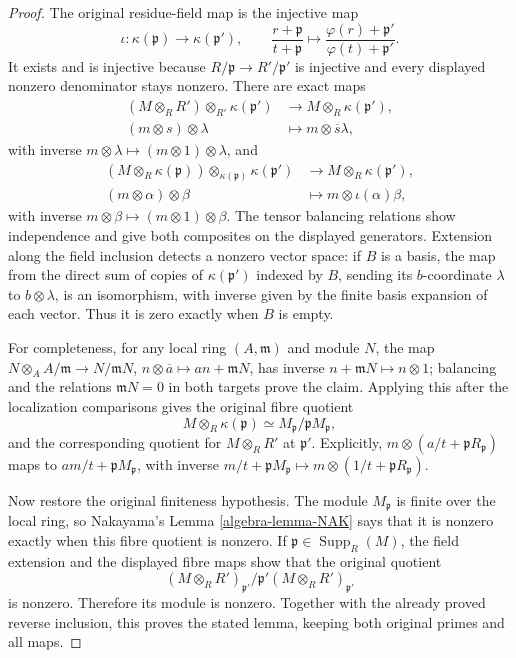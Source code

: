 \begin{proof}
The original residue-field map is the injective map
$$
\iota:\kappa(\mathfrak p)\longrightarrow\kappa(\mathfrak p'),
\qquad
\frac{r+\mathfrak p}{t+\mathfrak p}
\longmapsto
\frac{\varphi(r)+\mathfrak p'}{\varphi(t)+\mathfrak p'}.
$$
It exists and is injective because $R/\mathfrak p\to
R'/\mathfrak p'$ is injective and every displayed
nonzero denominator stays nonzero. There are exact maps
$$
\begin{split}
(M\otimes_RR')\otimes_{R'}\kappa(\mathfrak p')
&\longrightarrow M\otimes_R\kappa(\mathfrak p'),\\
(m\otimes s)\otimes\lambda
&\longmapsto m\otimes\overline s\lambda,
\end{split}
$$
with inverse $m\otimes\lambda\mapsto(m\otimes1)\otimes\lambda$,
and
$$
\begin{split}
(M\otimes_R\kappa(\mathfrak p))
\otimes_{\kappa(\mathfrak p)}\kappa(\mathfrak p')
&\longrightarrow M\otimes_R\kappa(\mathfrak p'),\\
(m\otimes\alpha)\otimes\beta
&\longmapsto m\otimes\iota(\alpha)\beta,
\end{split}
$$
with inverse $m\otimes\beta\mapsto(m\otimes1)\otimes\beta$.
The tensor balancing relations show independence and give
both composites on the displayed generators. Extension
along the field inclusion detects a nonzero vector space:
if $B$ is a basis, the map from the direct sum of copies
of $\kappa(\mathfrak p')$ indexed by $B$, sending its
$b$-coordinate $\lambda$ to $b\otimes\lambda$, is an
isomorphism, with inverse given by the finite basis
expansion of each vector. Thus it is zero exactly when
$B$ is empty.

For completeness, for any local ring $(A,\mathfrak m)$
and module $N$, the map
$N\otimes_A A/\mathfrak m\to N/\mathfrak mN$,
$n\otimes\overline a\mapsto an+\mathfrak mN$, has inverse
$n+\mathfrak mN\mapsto n\otimes1$; balancing and the
relations $\mathfrak mN=0$ in both targets prove the claim.
Applying this after the localization comparisons gives the
original fibre quotient
$$
M\otimes_R\kappa(\mathfrak p)
\simeq M_{\mathfrak p}/\mathfrak pM_{\mathfrak p},
$$
and the corresponding quotient for $M\otimes_RR'$ at
$\mathfrak p'$. Explicitly,
$m\otimes(a/t+\mathfrak pR_{\mathfrak p})$ maps to
$am/t+\mathfrak pM_{\mathfrak p}$, with inverse
$m/t+\mathfrak pM_{\mathfrak p}\mapsto
m\otimes(1/t+\mathfrak pR_{\mathfrak p})$.

Now restore the original finiteness hypothesis. The module
$M_{\mathfrak p}$ is finite over the local ring, so
Nakayama's Lemma \ref{algebra-lemma-NAK} says that it is nonzero
exactly when this fibre quotient is nonzero. If
$\mathfrak p\in\operatorname{Supp}_R(M)$, the field
extension and the displayed fibre maps show that the
original quotient
$$
(M\otimes_RR')_{\mathfrak p'}/
\mathfrak p'(M\otimes_RR')_{\mathfrak p'}
$$
is nonzero. Therefore its module is nonzero. Together
with the already proved reverse inclusion, this proves
the stated lemma, keeping both original primes and all maps.


\end{proof}
